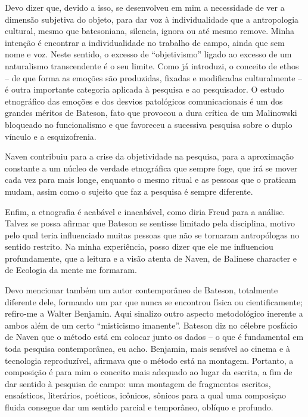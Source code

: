 \documentclass[a4paper, 12pt]{article} %
\begin{document}
Devo dizer que, devido a isso, se desenvolveu em mim a necessidade de ver a dimensão subjetiva do objeto, para dar voz à individualidade que a antropologia cultural, mesmo que batesoniana, silencia, ignora ou até mesmo remove. Minha intenção é encontrar a individualidade no trabalho de campo, ainda que sem nome e voz. Neste sentido, o excesso de “objetivismo” ligado ao excesso de um naturalismo transcendente é o seu limite. Como já introduzi, o conceito de ethos – de que forma as emoções são produzidas, fixadas e modificadas culturalmente – é outra importante categoria aplicada à pesquisa e ao pesquisador. O estudo etnográfico das emoções e dos desvios patológicos comunicacionais é um dos grandes méritos de Bateson, fato que provocou a dura crítica de um Malinowski bloqueado no funcionalismo e que favoreceu a sucessiva pesquisa sobre o duplo vínculo e a esquizofrenia.

Naven contribuiu para a crise da objetividade na pesquisa, para a aproximação constante a um núcleo de verdade etnográfica que sempre foge, que irá se mover cada vez para mais longe, enquanto o mesmo ritual e as pessoas que o praticam mudam, assim como o sujeito que faz a pesquisa é sempre diferente.

Enfim, a etnografia é acabável e inacabável, como diria Freud para a análise. Talvez se possa afirmar que Bateson se sentisse limitado pela disciplina, motivo pelo qual teria influenciado muitas pessoas que não se tornaram antropólogas no sentido restrito. Na minha experiência, posso dizer que ele me influenciou profundamente, que a leitura e a visão atenta de Naven, de Balinese character e de Ecologia da mente me formaram.

Devo mencionar também um autor contemporâneo de Bateson, totalmente diferente dele, formando um par que nunca se encontrou física ou cientificamente; refiro-me a Walter Benjamin. Aqui sinalizo outro aspecto metodológico inerente a ambos além de um certo “misticismo imanente”. Bateson diz no célebre posfácio de Naven que o método está em colocar junto os dados – o que é fundamental em toda pesquisa contemporânea, eu acho. Benjamin, mais sensível ao cinema e à tecnologia reproduzível, afirmava que o método está na montagem. Portanto, a composição é para mim o conceito mais adequado ao lugar da escrita, a fim de dar sentido à pesquisa de campo: uma montagem de fragmentos escritos, ensaísticos, literários, poéticos, icônicos, sônicos para a qual uma composiçao fluida consegue dar um sentido parcial e temporâneo, oblíquo e profundo. 
\end{document}
